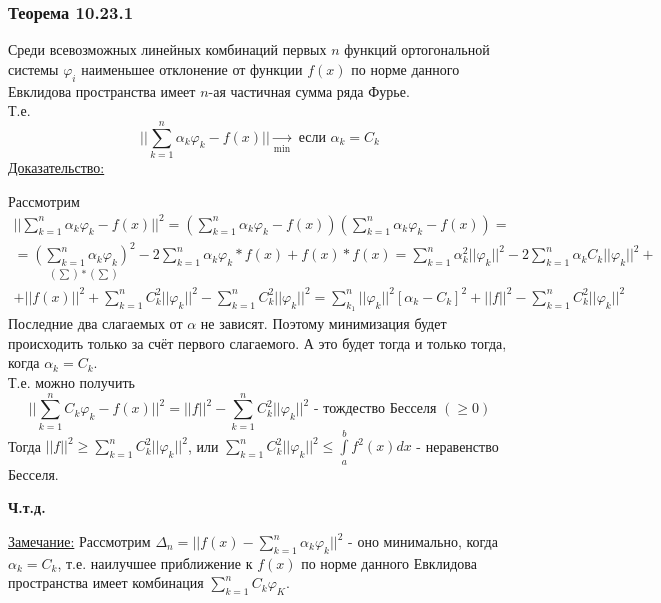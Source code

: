 \documentclass[12pt]{article}
\let\oldint\int
\let\oldsum\sum
\renewcommand{\int}{\oldint\limits}
\renewcommand{\sum}{\oldsum\limits}
\begin{document}
    \subsubsection*{Теорема 10.23.1}\label{th:10.23.1}
    Среди всевозможных линейных комбинаций первых $n$ функций ортогональной системы $\varphi_i$ наименьшее отклонение от функции $f(x)$ по норме данного Евклидова пространства имеет $n$-ая частичная сумма ряда Фурье.\\
    Т.е. \[ \Big|\Big|\sum_{k=1}^{n}\alpha_k \varphi_k - f(x)\Big|\Big| \underset{\text{min}}{\to} \text{ если } \alpha_k = C_k \]
    \underline{Доказательство:}
    \begin{adjustwidth}{1.5em}{1.5em}
      Рассмотрим
      \begin{gather*}
          \Big|\Big|\sum_{k=1}^{n} \alpha_k \varphi_k - f(x)\Big|\Big|^2 = (\sum_{k=1}^{n}\alpha_k \varphi_k - f(x))(\sum_{k=1}^{n}\alpha_k \varphi_k - f(x)) =\\
          = \underset{(\sum) * (\sum)}{(\sum_{k=1}^{n} \alpha_k \varphi_k)^2} - 2 \sum_{k=1}^{n}\alpha_k \varphi_k * f(x) + f(x) * f(x) = \sum_{k=1}^{n}\alpha^2_k ||\varphi_k||^2 - 2 \sum_{k=1}^{n} \alpha_k C_k ||\varphi_k||^2 +\\
          + ||f(x)||^2 + \sum_{k=1}^{n}C^2_k ||\varphi_k||^2 - \sum_{k=1}^{n}C^2_k ||\varphi_k||^2 = \sum_{k_1}^{n} ||\varphi_k||^2 [ \alpha_k - C_k ]^2 + ||f||^2 - \sum_{k=1}^{n}C^2_k ||\varphi_k||^2
      \end{gather*}
      Последние два слагаемых от $\alpha$ не зависят. Поэтому минимизация будет происходить только за счёт первого слагаемого. А это будет тогда и только тогда, когда $\alpha_k = C_k$.\\
      Т.е. можно получить
      \[ \Big|\Big| \sum_{k=1}^{n} C_k \varphi_k - f(x)\Big|\Big|^2 = ||f||^2 - \sum_{k=1}^{n}C^2_k ||\varphi_k||^2 \text{ - тождество Бесселя } (\geq 0) \]
      Тогда $||f||^2 \geq \sum_{k=1}^{n}C^2_k ||\varphi_k||^2$, или $\sum_{k=1}^{n} C^2_k ||\varphi_k||^2 \leq \int_{a}^{b} f^2(x)dx$ - неравенство Бесселя.
      \begin{center}
          \textbf{Ч.т.д.}
      \end{center}
    \end{adjustwidth}
    \underline{Замечание:} Рассмотрим $\Delta_n = ||f(x) - \sum_{k=1}^{n}\alpha_k \varphi_k ||^2$ - оно минимально, когда $\alpha_k = C_k$, т.е. наилучшее приближение к $f(x)$ по норме данного Евклидова пространства имеет комбинация $\sum_{k=1}^{n} C_k \varphi_K$.
  
\end{document}
